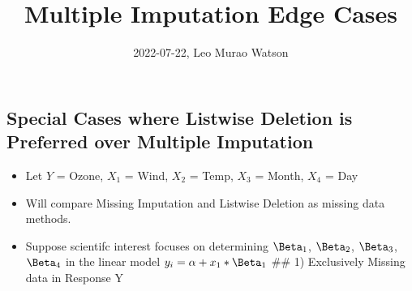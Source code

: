 \documentclass[
]{article}
\title{Multiple Imputation Edge Cases}
\author{}
\date{\vspace{-2.5em}2022-07-22, Leo Murao Watson}
\providecommand{\tightlist}{%
  \setlength{\itemsep}{0pt}\setlength{\parskip}{0pt}}
\begin{document}
\maketitle

\hypertarget{special-cases-where-listwise-deletion-is-preferred-over-multiple-imputation}{%
\subsection{Special Cases where Listwise Deletion is Preferred over
Multiple
Imputation}\label{special-cases-where-listwise-deletion-is-preferred-over-multiple-imputation}}

\begin{itemize}
\tightlist
\item
  Let \(Y\) = Ozone, \(X_1\) = Wind, \(X_2\) = Temp, \(X_3\) = Month,
  \(X_4\) = Day
\item
  Will compare Missing Imputation and Listwise Deletion as missing data
  methods.
\item
  Suppose scientifc interest focuses on determining \(\Beta_1\),
  \(\Beta_2\), \(\Beta_3\), \(\Beta_4\) in the linear model
  \(y_i = \alpha + x_1*\Beta_1\) \#\# 1) Exclusively Missing data in
  Response Y
\end{itemize}
\end{document}
